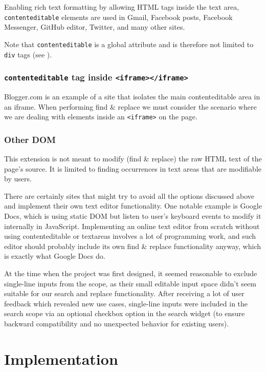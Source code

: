 \documentclass[bsc,frontabs,twoside,singlespacing,parskip,deptreport]{infthesis}
\begin{document}
Enabling rich text formatting by allowing HTML tags inside the text
area, \texttt{contenteditable} elements are used in Gmail, Facebook
posts, Facebook Messenger, GitHub editor, Twitter, and many other sites.

Note that \texttt{contenteditable} is a global attribute and is
therefore not limited to \texttt{div} tags (see \cite{M4}).

\subsection{\texttt{contenteditable} tag inside 
\texttt{\textless{}iframe\textgreater{}\textless{}/iframe\textgreater{}}}

Blogger.com is an example of a site that isolates the main
contenteditable area in an iframe. When performing find \& replace we
must consider the scenario where we are dealing with elements inside an \texttt{\textless{}iframe\textgreater{}} on the page.

\subsection{Other DOM}
This extension is not meant to modify (find \& replace) the raw HTML text of the page's source. It is limited to finding occurrences in text areas that are modifiable by users.  

There are certainly sites that might try to avoid all the options discussed above and implement their own text editor functionality. One notable example is Google Docs, which is using static DOM but listen to user's keyboard events to modify it internally in JavaScript. Implementing an online text editor from scratch without using contenteditable or textareas involves a lot of programming work, and such editor should probably include its own find \& replace functionality anyway, which is exactly what Google Docs do.

At the time when the project was first designed, it seemed reasonable to exclude single-line inputs from the scope, as their small editable input space didn't seem suitable for our search and replace functionality. After receiving a lot of user feedback which revealed new use cases, single-line inputs were included in the search scope via an optional checkbox option in the search widget (to ensure backward compatibility and no unexpected behavior for existing users).

\chapter{Implementation}
\end{document}
